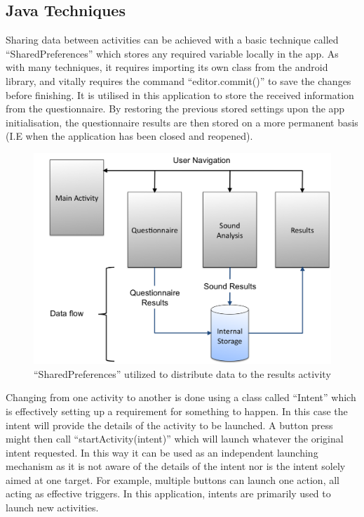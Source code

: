 \subsection{Java Techniques}
Sharing data between activities can be achieved with a basic technique called ``SharedPreferences'' which stores any required variable locally in the app\cite{android2014sp}. As with many techniques, it requires importing its own class from the android library, and vitally requires the command ``editor.commit()'' to save the changes before finishing. It is utilised in this application to store the received information from the questionnaire. By restoring the previous stored settings upon the app initialisation, the questionnaire results are then stored on a more permanent basis (I.E when the application has been closed and reopened).
\begin{figure}[ht!]
		\centering
			\includegraphics[width=.9\textwidth]{drawings/Data_Structure.png}
		\caption{``SharedPreferences'' utilized to distribute data to the results activity}
		\label{fig:dataStructure}
	\end{figure}

	 Changing from one activity to another is done using a class called ``Intent'' which is effectively setting up a requirement for something to happen. In this case the intent will provide the details of the activity to be launched. A button press might then call ``startActivity(intent)'' which will launch whatever the original intent requested. In this way it can be used as an independent launching mechanism as it is not aware of the details of the intent nor is the intent solely aimed at one target. For example, multiple buttons can launch one action, all acting as effective triggers. In this application, intents are primarily used to launch new activities.

